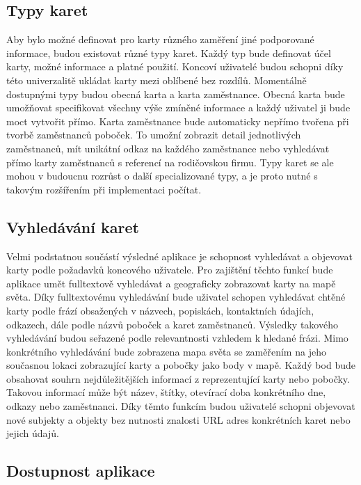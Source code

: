 	\subsection{Typy karet}

	Aby bylo možné definovat pro karty různého zaměření jiné podporované informace, budou existovat různé typy karet.
	Každý typ bude definovat účel karty, možné informace a platné použití.
	Koncoví uživatelé budou schopni díky této univerzalitě ukládat karty mezi oblíbené bez rozdílů.
	Momentálně dostupnými typy budou obecná karta a karta zaměstnance.
	Obecná karta bude umožňovat specifikovat všechny výše zmíněné informace a každý uživatel ji bude moct vytvořit přímo.
	Karta zaměstnance bude automaticky nepřímo tvořena při tvorbě zaměstnanců poboček.
	To umožní zobrazit detail jednotlivých zaměstnanců, mít unikátní odkaz na každého zaměstnance nebo vyhledávat
	přímo karty zaměstnanců s referencí na rodičovskou firmu.
	Typy karet se ale mohou v budoucnu rozrůst o další specializované typy, a je proto nutné s takovým rozšířením při
	implementaci počítat.

	\subsection{Vyhledávání karet}

	Velmi podstatnou součástí výsledné aplikace je schopnost vyhledávat a objevovat karty podle požadavků koncového uživatele.
	Pro zajištění těchto funkcí bude aplikace umět fulltextově vyhledávat a geograficky zobrazovat karty na mapě světa.
	Díky fulltextovému vyhledávání bude uživatel schopen vyhledávat chtěné karty podle frází obsažených v názvech,
	popiskách, kontaktních údajích, odkazech, dále podle názvů poboček a karet zaměstnanců.
	Výsledky takového vyhledávání budou seřazené podle relevantnosti vzhledem k hledané frázi.
	Mimo konkrétního vyhledávání bude zobrazena mapa světa se zaměřením na jeho současnou lokaci zobrazující
	karty a pobočky jako body v mapě.
	Každý bod bude obsahovat souhrn nejdůležitějších informací z reprezentující karty nebo pobočky.
	Takovou informací může být název, štítky, otevírací doba konkrétního dne, odkazy nebo zaměstnanci.
	Díky těmto funkcím budou uživatelé schopni objevovat nové subjekty a objekty bez nutnosti znalosti \ac{URL} adres
	konkrétních karet nebo jejich údajů.

	\subsection{Dostupnost aplikace}

